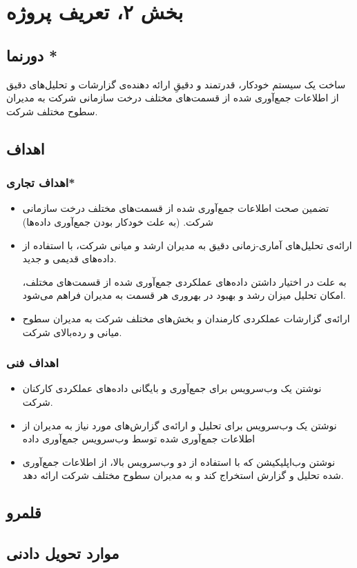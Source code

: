 \chapter{بخش ۲، تعریف پروژه\\}
\section{دورنما *}
ساخت یک سیستم خودکار، قدرتمند و دقیقِ ارائه دهنده‌ی گزارشات و تحلیل‌های دقیق از اطلاعات جمع‌آوری شده از قسمت‌های مختلف درخت سازمانی شرکت  به مدیران سطوح مختلف شرکت.

\section{اهداف }
\subsection{اهداف تجاری*}
\begin{itemize}
\item 
تضمین صحت اطلاعات جمع‌آوری شده از قسمت‌های مختلف درخت سازمانی شرکت. (به علت خودکار بودن جمع‌آوری داده‌ها)
\item 
ارائه‌ی تحلیل‌های آماری-زمانی دقیق به مدیران ارشد و میانی شرکت، با استفاده از داده‌های قدیمی و جدید.

به علت در اختیار‌ داشتن داده‌های عملکردی جمع‌آوری شده از قسمت‌های مختلف، امکان تحلیل میزان رشد و بهبود در بهروری هر قسمت به مدیران فراهم می‌شود.
\item 
ارائه‌ی گزارشات عملکردی کارمندان و بخش‌های مختلف شرکت به مدیران سطوح میانی و رده‌بالای شرکت.
\end{itemize}
\subsection{اهداف فنی}
\begin{itemize}
\item
نوشتن یک وب‌سرویس برای جمع‌آوری و بایگانی داده‌های عملکردی کارکنان شرکت.
\item 
نوشتن یک وب‌سرویس برای تحلیل‌ و ارائه‌ی گزار‌ش‌های مورد نیاز به مدیران از اطلاعات جمع‌آوری شده توسط وب‌سرویس جمع‌آوری داده
\item 
نوشتن وب‌اپلیکیشن 
که با استفاده از دو وب‌سرویس بالا، از اطلاعات جمع‌آوری شده تحلیل و گزارش استخراج کند و به مدیران سطوح مختلف شرکت ارائه دهد.
\end{itemize}
\section{قلمرو }
\section{موارد تحویل دادنی }
